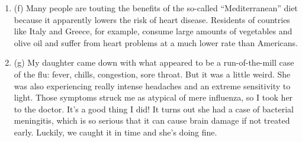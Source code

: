 \begin{enumerate}
\begin{enumerate}
\item (f) Many people are touting the benefits of the so-called ``Mediterranean'' diet because it
apparently lowers the risk of heart disease. Residents of countries like Italy and Greece, for
example, consume large amounts of vegetables and olive oil and suffer from heart
problems at a much lower rate than Americans.
\item (g) My daughter came down with what appeared to be a run-of-the-mill case of the flu:
fever, chills, congestion, sore throat. But it was a little weird. She was also experiencing
really intense headaches and an extreme sensitivity to light. Those symptoms struck me as
atypical of mere influenza, so I took her to the doctor. It's a good thing I did! It turns out
she had a case of bacterial meningitis, which is so serious that it can cause brain damage if
not treated early. Luckily, we caught it in time and she's doing fine.
\end{enumerate}
\end{enumerate}
